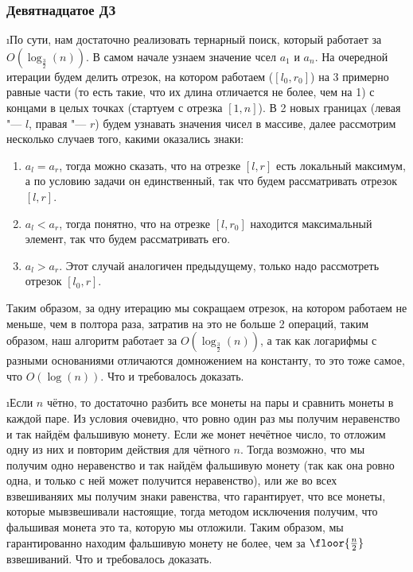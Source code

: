 \subsubsection{Девятнадцатое ДЗ}


\i По сути, нам достаточно реализовать тернарный поиск, который работает за $O(\log_{\frac{3}{2}}(n))$. В самом начале узнаем значение чсел $a_1$ и $a_n$. На очередной итерации будем делить отрезок, на котором работаем ($[l_0, r_0]$) на 3 примерно равные части (то есть такие, что их длина отличается не более, чем на 1) с концами в целых точках (стартуем с отрезка $[1, n]$). В 2 новых границах (левая "--- $l$, правая "--- $r$) будем узнавать значения чисел в массиве, далее рассмотрим несколько случаев того, какими оказались знаки:
\begin{enumerate}
    \item $a_l = a_r$, тогда можно сказать, что на отрезке $[l, r]$ есть локальный максимум, а по условию задачи он единственный, так что будем рассматривать отрезок $[l, r]$.
    \item $a_l < a_r$, тогда понятно, что на отрезке $[l, r_0]$ находится максимальный элемент, так что будем рассматривать его.
    \item $a_l > a_r$. Этот случай аналогичен предыдущему, только надо рассмотреть отрезок $[l_0, r]$.
\end{enumerate}
Таким образом, за одну итерацию мы сокращаем отрезок, на котором работаем не меньше, чем в полтора раза, затратив на это не больше 2 операций, таким образом, наш алгоритм работает за $O(\log_{\frac{3}{2}}(n))$, а так как логарифмы с разными основаниями отличаются домножением на константу, то это тоже самое, что $O(\log(n))$. Что и требовалось доказать.

\i Если $n$ чётно, то достаточно разбить все монеты на пары и сравнить монеты в каждой паре. Из условия очевидно, что ровно один раз мы получим неравенство и так найдём фальшивую монету. Если же монет нечётное число, то отложим одну из них и повторим действия для чётного $n$. Тогда возможно, что мы получим одно неравенство и так найдём фальшивую монету (так как она ровно одна, и только с ней может получится неравенство), или же во всех взвешиваняих мы получим знаки равенства, что гарантирует, что все монеты, которые мывзвешивали настоящие, тогда методом исключения получим, что фальшивая монета это та, которую мы отложили. Таким образом, мы гарантированно находим фальшивую монету не более, чем за $\floor{\frac{n}{2}}$ взвешиваний. Что и требовалось доказать.

